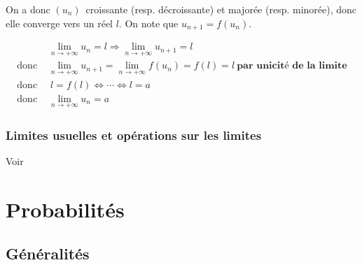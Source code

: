 \documentclass{report}
\newcommand{\un}{$(u_n)$~}
\begin{document}
    On a donc \un croissante (resp. décroissante) et majorée (resp. minorée), donc elle converge vers un réel $l$. On note que $u_{n+1} = f(u_n)$.

    \begin{align*}
      &\boxed{\lim_{n\to+\infty} u_n = l \Rightarrow \lim_{n\to+\infty} u_{n+1} = l} \\
      \text{donc~} &\boxed{\lim_{n\to+\infty} u_{n+1} = \lim_{n\to+\infty} f(u_n) = f(l) = l } ~\textbf{par unicité de la limite}\\
      \text{donc~} &\boxed{~l = f(l) \Leftrightarrow \cdots \Leftrightarrow l = a} \\
      \text{donc~} &\boxed{\lim_{n\to+\infty} u_n = a}
    \end{align*}

    \subsubsection{Limites usuelles et opérations sur les limites}

    Voir 

    \iffalse
    Soient $(u_n)$ et $(v_n)$ deux suites avec $\lim_{n \to +\infty} u_n = l$ et $\lim_{n \to +\infty} v_n = m$. Alors :
    \begin{itemize}
        \item $\lim_{n \to +\infty} (u_n + v_n) = l + m$
        \item $\lim_{n \to +\infty} (u_n \cdot v_n) = l \cdot m$
        \item Si $m \neq 0$, $\lim_{n \to +\infty} \frac{u_n}{v_n} = \frac{l}{m}$
    \end{itemize}
    \fi

    \iffalse
    \subsection{Exemples de Suites Divergentes}
    - Suite géométrique de raison supérieure à 1 : $(u_n) = 2^n \to +\infty$ quand $n \to +\infty$.
    - Suite harmonique $(u_n) = \frac{1}{n}$ : $\lim_{n \to +\infty} u_n = 0$ (convergence vers 0).
    \fi



    \newpage


    \section{Probabilités}
    \subsection{Généralités}
\end{document}
